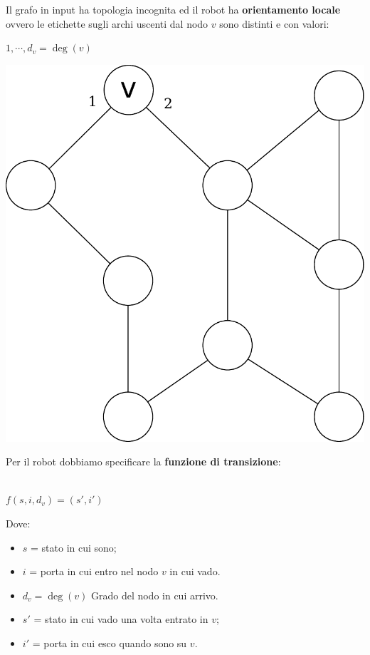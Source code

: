 Il grafo in input ha topologia incognita ed il robot ha \textbf{orientamento locale} ovvero le etichette sugli archi uscenti dal nodo $v$ sono distinti e con valori:
\begin{center}
$1, \cdots, d_v = \deg (v)$\end{center}
\begin{center}
   \includegraphics[scale=0.3]{images/n_25}
\end{center}

Per il robot dobbiamo specificare la \textbf{funzione di transizione}:\\\\
\begin{center}
 $f(s,i,d_v) = (s',i')$
\end{center}

Dove:
\begin{itemize}
 \item $s$ = stato in cui sono;
 \item $i$ = porta in cui entro nel nodo $v$ in cui vado.
 \item $d_v = \deg(v)$ Grado del nodo in cui arrivo.
 \item $s'$ = stato in cui vado una volta entrato in $v$;
 \item $i'$ = porta in cui esco quando sono su $v$.
\end{itemize}

